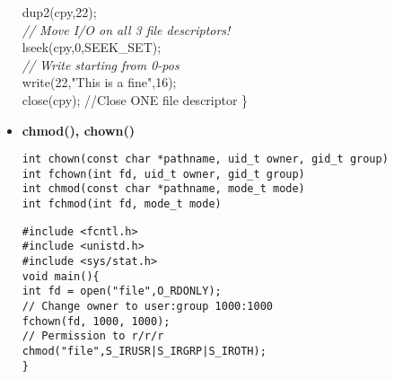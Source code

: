 \begin{flushleft}
\begin{flushleft}
\begin{itemize}
{                    \halftab dup2(cpy,22); \\ 
                    \halftab \textit{// Move I/O on all 3 file descriptors!} \\
                    \halftab lseek(cpy,0,SEEK\_SET); \\
                    \halftab \textit{// Write starting from 0-pos} \\
                    \halftab write(22,"This is a fine\n",16); \\
                    \halftab close(cpy); //Close ONE file descriptor
                    \} }
      \item \textbf{chmod(), chown()} \par 
            \texttt{int chown(const char *pathname, uid\_t owner, gid\_t group)\\
                    int fchown(int fd, uid\_t owner, gid\_t group)\\
                    int chmod(const char *pathname, mode\_t mode)\\
                    int fchmod(int fd, mode\_t mode)}\par  
            \texttt{\#include <fcntl.h>\\
                    \#include <unistd.h>\\
                    \#include <sys/stat.h>\\
                    void main()\{ \\
                    \halftab int fd = open("file",O\_RDONLY);\\
                    \halftab // Change owner to user:group 1000:1000\\
                    \halftab fchown(fd, 1000, 1000); \\
                    \halftab // Permission to r/r/r\\
                    \halftab chmod("file",S\_IRUSR|S\_IRGRP|S\_IROTH); \\
                    \}}
    \end{itemize}

\end{flushleft}
\end{flushleft}
